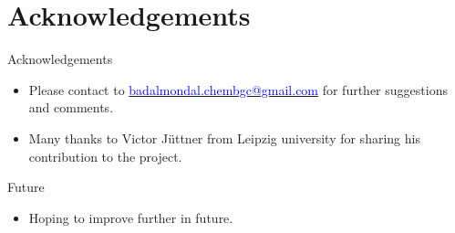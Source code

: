 \section{Acknowledgements}
\begin{frame}{Acknowledgements}
\begin{itemize}
    \item Please contact to \href{mailto:badalmondal.chembgc@gmail.com}{\textcolor{blue}{badalmondal.chembgc@gmail.com}} for further suggestions and comments.
    \item Many thanks to Victor J\"uttner from Leipzig university for sharing his contribution to the project.
\end{itemize}
\end{frame}
\begin{frame}{Future}
    \begin{itemize}
        \item Hoping to improve further in future.
    \end{itemize}
\end{frame}